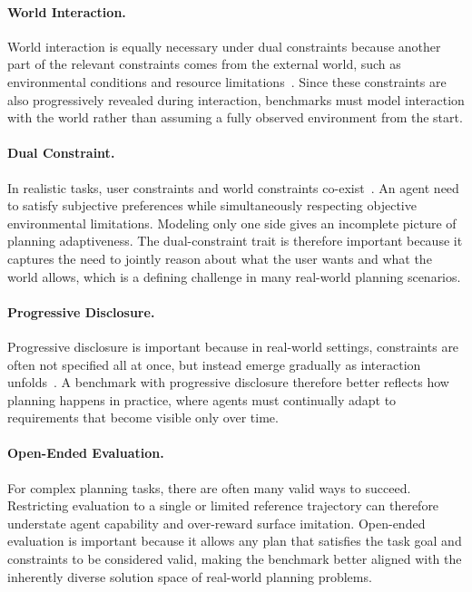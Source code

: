 \documentclass{llmxive}
\begin{document}
\paragraph{World Interaction.}
World interaction is equally necessary under dual constraints because another part of the relevant constraints comes from the external world, such as environmental conditions and resource limitations~\citep{PlanBench}. 
Since these constraints are also progressively  revealed during interaction, benchmarks must model interaction with the world rather than assuming a fully observed environment from the start.

\paragraph{Dual Constraint.}
In realistic tasks, user constraints and world constraints co-exist~\citep{wang2024apricotactivepreferencelearning,silver2025coloringlinespersonalizationnull}.
An agent need to satisfy subjective preferences while simultaneously respecting objective environmental limitations. 
Modeling only one side gives an incomplete picture of planning adaptiveness. 
The dual-constraint trait is therefore important because it captures the need to jointly reason about what the user wants and what the world allows, which is a defining challenge in many real-world planning scenarios.

\paragraph{Progressive Disclosure.}
Progressive disclosure is important because in real-world settings, constraints are often not specified all at once, but instead emerge gradually as interaction unfolds~\citep{tau-2-bench,RealPref}. 
A benchmark with progressive disclosure therefore better reflects how planning happens in practice, where agents must continually adapt to requirements that become visible only over time.

\paragraph{Open-Ended Evaluation.}
For complex planning tasks, there are often many valid ways to succeed. 
Restricting evaluation to a single or limited reference trajectory can therefore understate agent capability and over-reward surface imitation. 
Open-ended evaluation is important because it allows any plan that satisfies the task goal and constraints to be considered valid, making the benchmark better aligned with the inherently diverse solution space of real-world planning problems.
\end{document}
